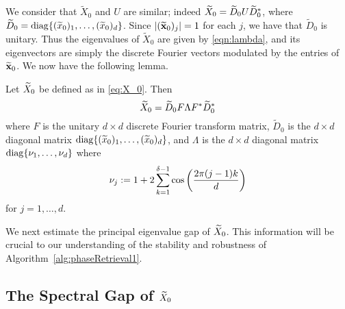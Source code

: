 We consider that $\widetilde{X}_0$ and $U$ are similar; indeed $\widetilde{X}_0 = \widetilde{D}_0 U \widetilde{D}_0^*$, where $\widetilde{D}_0 = \mathrm{diag}\{(\widetilde{x}_0)_1, \ldots, (\widetilde{x}_0)_d\}$.  Since $|(\widetilde{\mathbf x}_0)_j| = 1$ for each $j$, we have that $\widetilde{D}_0$ is unitary.  Thus the eigenvalues of $\widetilde{X}_0$ are given by \eqref{eqn:lambda}, and its eigenvectors are simply the discrete Fourier vectors modulated by the entries of $\widetilde{\mathbf x}_0$.  %
We now have the following lemma.

\begin{lem}
Let $\widetilde{X}_0$ be defined as in \eqref{eq:X_0}.  Then $$\widetilde{X}_0 = \widetilde{D}_0 F \Lambda F^* \widetilde{D}_0^*$$ where $F$ is the unitary $d \times d$ discrete Fourier transform matrix, $\widetilde{D}_0$ is the $d \times d$ diagonal matrix $\mathrm{diag}\{(\widetilde{x}_0)_1, \ldots, (\widetilde{x}_0)_d\}$, and $\Lambda$ is the $d \times d$ diagonal matrix $\mathrm{diag}\{\nu_1, \ldots, \nu_{d}\}$ where
$$\nu_j := 1 + 2 \sum_{k = 1}^{\delta - 1}\cos\left(\frac{\displaystyle 2\pi (j-1) k}{\displaystyle d}\right)$$
for $j = 1, \dots, d$.
\label{lem:spectrum}
\end{lem}

We next estimate the principal eigenvalue gap of $\widetilde{X}_0$.  This information will be crucial to our understanding of the stability and robustness of Algorithm~\ref{alg:phaseRetrieval1}.  

\subsection{The Spectral Gap of $\widetilde{X}_0$}

